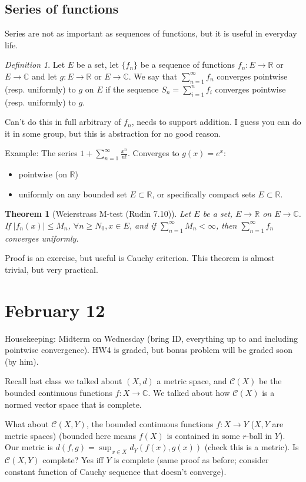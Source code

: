 \documentclass{article}
\theoremstyle{plain}
\newtheorem{theorem}{Theorem}
\theoremstyle{remark}
\newtheorem{definition}{Definition}
\newcommand{\R}{{\mathbb R}}
\newcommand{\C}{{\mathbb C}}
\begin{document}
\subsection{Series of functions}
Series are not as important as sequences of functions,
but it is useful in everyday life.

\begin{definition}
	Let $E$ be a set, let $\{f_n\}$ be a sequence of functions
	$f_n \colon E \to \R$ or $E \to \C$
	and let $g \colon E \to \R$ or $E \to \C$.
	We say that $\sum_{n=1}^\infty f_n$ converges pointwise (resp. uniformly) to $g$ on $E$
	if the sequence $S_n = \sum_{i=1}^n f_i$ converges pointwise (resp. uniformly) to $g$.
\end{definition}
Can't do this in full arbitrary of $f_n$, needs to support addition.
I guess you can do it in some group, but this is abstraction for no good reason.

Example: The series $1 + \sum_{n=1}^\infty \frac{x^n}{n!}$.
Converges to $g(x) = e^x$:
\begin{itemize}
	\item pointwise (on $\R$)
	\item uniformly on any bounded set $E \subset \R$,
		or specifically compact sets $E \subset \R$.
\end{itemize}

\begin{theorem}[Weierstrass M-test (Rudin 7.10)]
	Let $E$ be a set, $E \to \R$ on $E \to \C$.
	If $\lvert f_n(x) \rvert \leq M_n$, $\forall n \geq N_0, x \in E$,
	and if $\sum_{n=1}^\infty M_n < \infty$,
	then $\sum_{n=1}^\infty f_n$ converges uniformly.
\end{theorem}
Proof is an exercise, but useful is Cauchy criterion.
This theorem is almost trivial, but very practical.

\section{February 12}
Housekeeping:
Midterm on Wednesday (bring ID, everything up to and including pointwise convergence).
HW4 is graded, but bonus problem will be graded soon (by him).

Recall last class we talked about $(X,d)$ a metric space,
and $\mathcal{C}(X)$ be the bounded continuous functions $f \colon X \to \C$.
We talked about how $\mathcal{C}(X)$ is a normed vector space that is complete.

What about $\mathcal{C}(X,Y)$,
the bounded continuous functions $f \colon X \to Y$ ($X,Y$ are metric spaces)
(bounded here means $f(X)$ is contained in some $r$-ball in $Y$).
Our metric is $d(f,g) = \sup_{x \in X} d_Y(f(x),g(x))$ (check this is a metric).
Is $\mathcal{C}(X,Y)$ complete?
Yes iff $Y$ is complete (same proof as before;
consider constant function of Cauchy sequence that doesn't converge).
\end{document}
